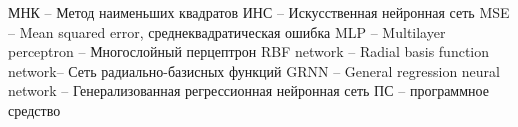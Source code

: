 \label{sec:definitions}

МНК -- Метод наименьших квадратов
ИНС -- Искусственная нейронная сеть
MSE -- Mean squared error, среднеквадратическая ошибка
MLP -- Multilayer perceptron -- Многослойный перцептрон
RBF network -- Radial basis function network-- Сеть радиально-базисных функций
GRNN -- General regression neural network -- Генерализованная регрессионная нейронная сеть
ПС -- программное средство
\\
